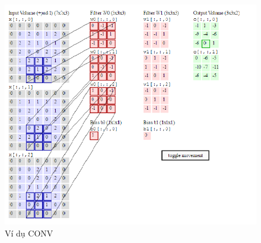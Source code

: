 \documentclass[a4paper,12pt]{report}
\begin{document}
\begin{center}
\begin{figure}[H]
\includegraphics[scale=0.7]{img3.png}
\caption{Ví dụ CONV}
\end{figure}
\end{center}
\end{document}
